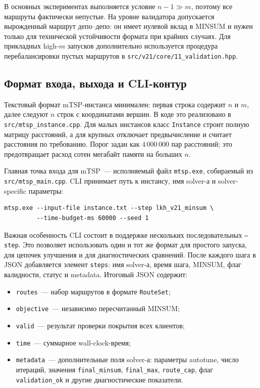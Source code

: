 \documentclass[14pt,a4paper]{extarticle}
\begin{document}
В основных экспериментах выполняется условие $n-1 \gg m$, поэтому все маршруты фактически непустые. На уровне валидатора допускается вырожденный маршрут депо--депо: он имеет нулевой вклад в MINSUM и нужен только для технической устойчивости формата при крайних случаях. Для прикладных high-$m$ запусков дополнительно используется процедура перебалансировки пустых маршрутов в \texttt{src/v21/core/11\_validation.hpp}.

\subsection{Формат входа, выхода и CLI-контур}

Текстовый формат mTSP-инстанса минимален: первая строка содержит $n$ и $m$, далее следуют $n$ строк с координатами вершин. В коде это реализовано в \texttt{src/mtsp\_instance.cpp}. Для малых инстансов класс \texttt{Instance} строит полную матрицу расстояний, а для крупных отключает предвычисление и считает расстояния по требованию. Порог задан как $4\,000\,000$ пар расстояний; это предотвращает расход сотен мегабайт памяти на больших $n$.

Главная точка входа для mTSP~--- исполняемый файл \texttt{mtsp.exe}, собираемый из \texttt{src/mtsp\_main.cpp}. CLI принимает путь к инстансу, имя solver-а и solver-specific параметры:
\begin{verbatim}
mtsp.exe --input-file instance.txt --step lkh_v21_minsum \
         --time-budget-ms 60000 --seed 1
\end{verbatim}

Важная особенность CLI состоит в поддержке нескольких последовательных \texttt{--step}. Это позволяет использовать один и тот же формат для простого запуска, для цепочек улучшения и для диагностических сравнений. После каждого шага в JSON добавляется элемент \texttt{steps}: имя solver-а, время шага, MINSUM, флаг валидности, статус и metadata. Итоговый JSON содержит:
\begin{itemize}
  \item \texttt{routes}~--- набор маршрутов в формате \texttt{RouteSet};
  \item \texttt{objective}~--- независимо пересчитанный MINSUM;
  \item \texttt{valid}~--- результат проверки покрытия всех клиентов;
  \item \texttt{time}~--- суммарное wall-clock-время;
  \item \texttt{metadata}~--- дополнительные поля solver-а: параметры autotune, число итераций, значения \texttt{final\_minsum}, \texttt{final\_max}, \texttt{route\_cap}, флаг \texttt{validation\_ok} и другие диагностические показатели.
\end{itemize}
\end{document}
